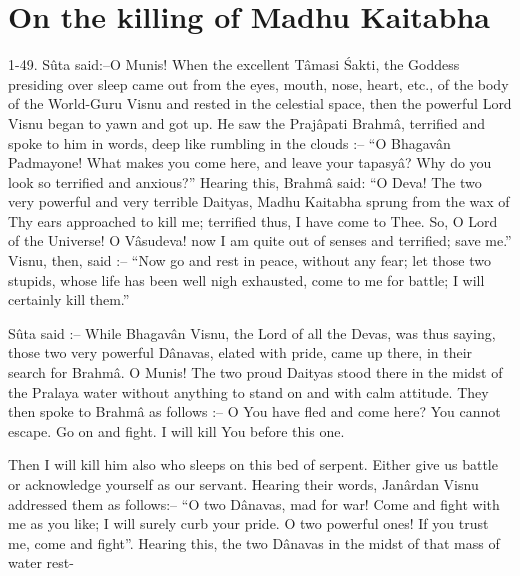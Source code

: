 \chapter{On the killing of Madhu Kaitabha}

1-49. S\^uta said:--O Munis! When the excellent T\^amasi \'Sakti, the Goddess presiding over sleep came out from the eyes, mouth, nose, heart, etc., of the body of the World-Guru Visnu and rested in the celestial space, then the powerful Lord Visnu began to yawn and got up. He saw the Praj\^apati Brahm\^a, terrified and spoke to him in words, deep like rumbling in the clouds :-- ``O Bhagav\^an Padmayone! What makes you come here, and leave your tapasy\^a? Why do you look so terrified and anxious?'' Hearing this, Brahm\^a said: ``O Deva! The two very powerful and very terrible Daityas, Madhu Kaitabha sprung from the wax of Thy ears approached to kill me; terrified thus, I have come to Thee. So, O Lord of the Universe! O V\^asudeva! now I am quite out of senses and terrified; save me.'' Visnu, then, said :-- ``Now go and rest in peace, without any fear; let those two stupids, whose life has been well nigh exhausted, come to me for battle; I will certainly kill them.''

S\^uta said :-- While Bhagav\^an Visnu, the Lord of all the Devas, was thus saying, those two very powerful D\^anavas, elated with pride, came up there, in their search for Brahm\^a. O Munis! The two proud Daityas stood there in the midst of the Pralaya water without anything to stand on and with calm attitude. They then spoke to Brahm\^a as follows :-- O You have fled and come here? You cannot escape. Go on and fight. I will kill You before this one.

Then I will kill him also who sleeps on this bed of serpent. Either give us battle or acknowledge yourself as our servant. Hearing their words, Jan\^ardan Visnu addressed them as follows:-- ``O two D\^anavas, mad for war! Come and fight with me as you like; I will surely curb your pride. O two powerful ones! If you trust me, come and fight''. Hearing this, the two D\^anavas in the midst of that mass of water rest-

